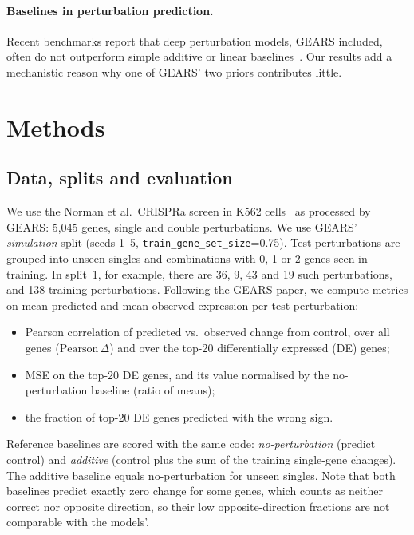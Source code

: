 \documentclass[11pt]{article}
\newcommand{\GEARS}{\textsc{GEARS}}
\begin{document}
\paragraph{Baselines in perturbation prediction.} Recent benchmarks report that deep perturbation models,
\GEARS{} included, often do not outperform simple additive or linear baselines~\cite{ahlmanneltze2025linear,
csendes2024benchmark}. Our results add a mechanistic reason why one of \GEARS{}' two priors contributes little.

\section{Methods}

\subsection{Data, splits and evaluation}
We use the Norman et al.\ CRISPRa screen in K562 cells~\cite{norman2019} as processed by \GEARS{}: 5,045 genes,
single and double perturbations. We use \GEARS{}' \emph{simulation} split (seeds 1--5,
\texttt{train\_gene\_set\_size}=0.75). Test perturbations are grouped into unseen singles and combinations with
0, 1 or 2 genes seen in training. In split~1, for example, there are 36, 9, 43 and 19 such perturbations, and 138
training perturbations. Following the \GEARS{} paper, we compute metrics on mean predicted and mean observed
expression per test perturbation:
\begin{itemize}
  \item Pearson correlation of predicted vs.\ observed change from control, over all genes ($\text{Pearson}\,\Delta$)
        and over the top-20 differentially expressed (DE) genes;
  \item MSE on the top-20 DE genes, and its value normalised by the no-perturbation baseline (ratio of means);
  \item the fraction of top-20 DE genes predicted with the wrong sign.
\end{itemize}
Reference baselines are scored with the same code: \emph{no-perturbation} (predict control) and \emph{additive}
(control plus the sum of the training single-gene changes). The additive baseline equals no-perturbation for unseen
singles. Note that both baselines predict exactly zero change for some genes, which counts as neither correct nor
opposite direction, so their low opposite-direction fractions are not comparable with the models'.
\end{document}
